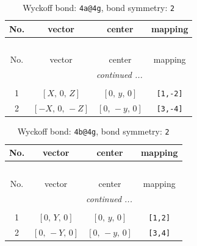 \documentclass[fleqn,8pt]{jsarticle}
\begin{document}
\begin{longtable}{cccc}
\caption{Wyckoff bond: {\tt 4a@4g}, bond symmetry: {\tt 2}}
 \\
 \hline \hline
No. & vector & center & mapping \\ \hline \endfirsthead

\multicolumn{3}{l}{\tablename\ \thetable{}} \\
 \hline \hline
No. & vector & center & mapping \\ \hline \endhead

 \hline \hline
\multicolumn{3}{r}{\footnotesize\it continued ...} \\ \endfoot

 \hline \hline
\multicolumn{3}{r}{} \\ \endlastfoot

1 & $\left[ X,\, 0,\, Z \right]$ & $\left[ 0,\, y,\, 0 \right]$ & {\tt [1,-2]} \\ \hline
2 & $\left[ - X,\, 0,\, - Z \right]$ & $\left[ 0,\, - y,\, 0 \right]$ & {\tt [3,-4]} \\
\end{longtable}
\renewcommand{\arraystretch}{1.2}
\begin{longtable}{cccc}
\caption{Wyckoff bond: {\tt 4b@4g}, bond symmetry: {\tt 2}}
 \\
 \hline \hline
No. & vector & center & mapping \\ \hline \endfirsthead

\multicolumn{3}{l}{\tablename\ \thetable{}} \\
 \hline \hline
No. & vector & center & mapping \\ \hline \endhead

 \hline \hline
\multicolumn{3}{r}{\footnotesize\it continued ...} \\ \endfoot

 \hline \hline
\multicolumn{3}{r}{} \\ \endlastfoot

1 & $\left[ 0,\, Y,\, 0 \right]$ & $\left[ 0,\, y,\, 0 \right]$ & {\tt [1,2]} \\ \hline
2 & $\left[ 0,\, - Y,\, 0 \right]$ & $\left[ 0,\, - y,\, 0 \right]$ & {\tt [3,4]} \\
\end{longtable}
\renewcommand{\arraystretch}{1.2}
\end{document}
